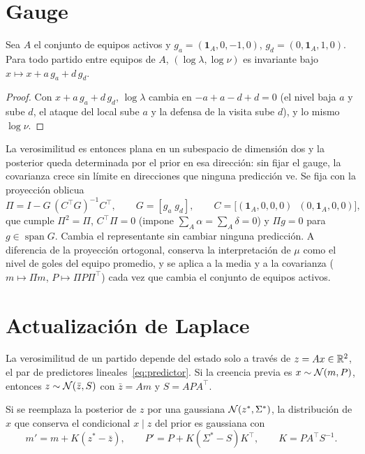\section{Gauge}
\label{sec:gauge}

\begin{proposicion} \dem
Sea $A$ el conjunto de equipos activos y $g_a=(\mathbf 1_A,0,-1,0)$, $g_d=(0,\mathbf 1_A,1,0)$. Para todo partido entre equipos de $A$, $(\log\lambda,\log\nu)$ es invariante bajo $x\mapsto x+a\,g_a+d\,g_d$.
\end{proposicion}

\begin{proof}
Con $x+a\,g_a+d\,g_d$, $\log\lambda$ cambia en $-a+a-d+d=0$ (el nivel baja $a$ y sube $d$, el ataque del local sube $a$ y la defensa de la visita sube $d$), y lo mismo $\log\nu$.
\end{proof}

La verosimilitud es entonces plana en un subespacio de dimensión dos y la posterior queda determinada por el prior en esa dirección: sin fijar el gauge, la covarianza crece sin límite en direcciones que ninguna predicción ve. Se fija con la proyección oblicua
\[
\Pi=I-G\,(C^\top G)^{-1}C^\top,\qquad G=[g_a\;g_d],\qquad C=\big[(\mathbf 1_A,0,0,0)\;\;(0,\mathbf 1_A,0,0)\big],
\]
que cumple $\Pi^2=\Pi$, $C^\top\Pi=0$ (impone $\sum_A\alpha=\sum_A\delta=0$) y $\Pi g=0$ para $g\in\operatorname{span}G$. Cambia el representante sin cambiar ninguna predicción. A diferencia de la proyección ortogonal, conserva la interpretación de $\mu$ como el nivel de goles del equipo promedio, y se aplica a la media y a la covarianza ($m\mapsto\Pi m$, $P\mapsto\Pi P\Pi^\top$) cada vez que cambia el conjunto de equipos activos.

\section{Actualización de Laplace}
\label{sec:laplace}

La verosimilitud de un partido depende del estado solo a través de $z=Ax\in\mathbb{R}^2$, el par de predictores lineales~\eqref{eq:predictor}. Si la creencia previa es $x\sim\mathcal{N}(m,P)$, entonces $z\sim\mathcal{N}(\bar z,S)$ con $\bar z=Am$ y $S=APA^\top$.

\begin{lema} \dem
Si se reemplaza la posterior de $z$ por una gaussiana $\mathcal{N}(z^*,\Sigma^*)$, la distribución de $x$ que conserva el condicional $x\mid z$ del prior es gaussiana con
\[
m'=m+K(z^*-\bar z),\qquad P'=P+K(\Sigma^*-S)K^\top,\qquad K=PA^\top S^{-1}.
\]
\end{lema}

